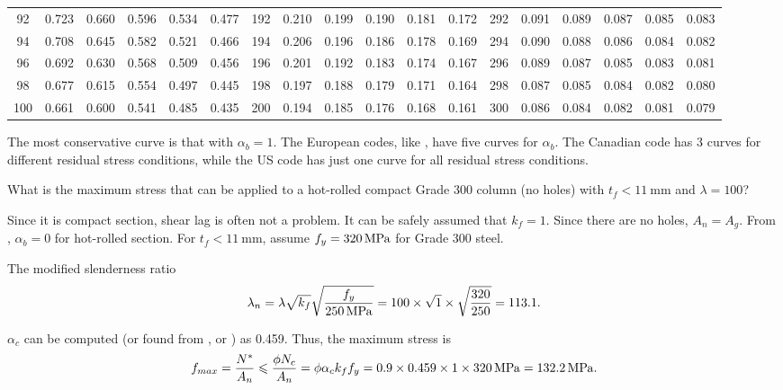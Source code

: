 \begin{table}[H]
\begin{tabular}{c|ccccc|c|ccccc|c|ccccc}
	    92      & 0.723 & 0.660 & 0.596 & 0.534 & 0.477 &     192     & 0.210 & 0.199 & 0.190 & 0.181 & 0.172 &     292     & 0.091 & 0.089 & 0.087 & 0.085 & 0.083 \\
	    94      & 0.708 & 0.645 & 0.582 & 0.521 & 0.466 &     194     & 0.206 & 0.196 & 0.186 & 0.178 & 0.169 &     294     & 0.090 & 0.088 & 0.086 & 0.084 & 0.082 \\
	    96      & 0.692 & 0.630 & 0.568 & 0.509 & 0.456 &     196     & 0.201 & 0.192 & 0.183 & 0.174 & 0.167 &     296     & 0.089 & 0.087 & 0.085 & 0.083 & 0.081 \\
	    98      & 0.677 & 0.615 & 0.554 & 0.497 & 0.445 &     198     & 0.197 & 0.188 & 0.179 & 0.171 & 0.164 &     298     & 0.087 & 0.085 & 0.084 & 0.082 & 0.080 \\
	    100     & 0.661 & 0.600 & 0.541 & 0.485 & 0.435 &     200     & 0.194 & 0.185 & 0.176 & 0.168 & 0.161 &     300     & 0.086 & 0.084 & 0.082 & 0.081 & 0.079 \\ \bottomrule
\end{tabular}
\end{table}

The most conservative curve is that with $\alpha_b=1$. The European codes, like \NZSSTEEL{}, have five curves for $\alpha_b$. The Canadian code has 3 curves for different residual stress conditions, while the US code has just one curve for all residual stress conditions.
\begin{exmp}
What is the maximum stress that can be applied to a hot-rolled compact Grade 300 column (no holes) with $t_f<\SI{11}{\mm}$ and $\lambda=100$?
\end{exmp}
\begin{solution}
Since it is compact section, shear lag is often not a problem. It can be safely assumed that $k_f=1$. Since there are no holes, $A_n=A_g$. From , $\alpha_b=0$ for hot-rolled section. For $t_f<\SI{11}{\mm}$, assume $f_y=\SI{320}{\mega\pascal}$ for Grade 300 steel.

The modified slenderness ratio
\begin{gather*}
\lambda_n=\lambda\sqrt{k_f}\sqrt{\dfrac{f_y}{\SI{250}{\mega\pascal}}}=100\times\sqrt{1}\times\sqrt{\dfrac{320}{250}}=113.1.
\end{gather*}

$\alpha_c$ can be computed (or found from , or ) as \num{0.459}. Thus, the maximum stress is
\begin{gather*}
f_{max}=\dfrac{N^*}{A_n}\leqslant\dfrac{\phi{}N_c}{A_n}=\phi\alpha_ck_ff_y=0.9\times0.459\times1\times\SI{320}{\mega\pascal}=\SI{132.2}{\mega\pascal}.
\end{gather*}
\end{solution}

